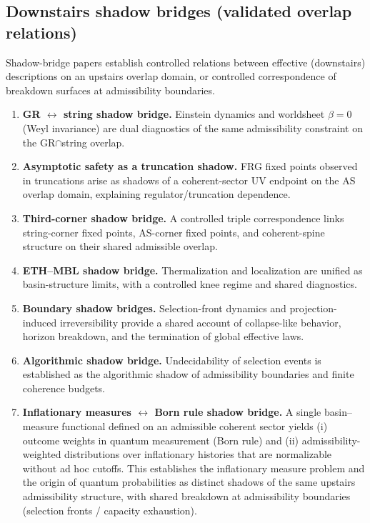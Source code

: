 \documentclass[11pt]{article}
\begin{document}
\subsection{Downstairs shadow bridges (validated overlap relations)}
Shadow-bridge papers establish controlled relations between effective (downstairs) descriptions on an upstairs overlap domain,
or controlled correspondence of breakdown surfaces at admissibility boundaries.

\begin{enumerate}[label=\textbf{B\arabic*}]
\item \textbf{GR $\leftrightarrow$ string shadow bridge.} Einstein dynamics and worldsheet $\beta=0$ (Weyl invariance) are dual diagnostics of the same admissibility constraint on the GR$\cap$string overlap.
\item \textbf{Asymptotic safety as a truncation shadow.} FRG fixed points observed in truncations arise as shadows of a coherent-sector UV endpoint on the AS overlap domain, explaining regulator/truncation dependence.
\item \textbf{Third-corner shadow bridge.} A controlled triple correspondence links string-corner fixed points, AS-corner fixed points, and coherent-spine structure on their shared admissible overlap.
\item \textbf{ETH--MBL shadow bridge.} Thermalization and localization are unified as basin-structure limits, with a controlled knee regime and shared diagnostics.
\item \textbf{Boundary shadow bridges.} Selection-front dynamics and projection-induced irreversibility provide a shared account of collapse-like behavior, horizon breakdown, and the termination of global effective laws.
\item \textbf{Algorithmic shadow bridge.} Undecidability of selection events is established as the algorithmic shadow of admissibility boundaries and finite coherence budgets.
\item \textbf{Inflationary measures $\leftrightarrow$ Born rule shadow bridge.} A single basin–measure functional defined
on an admissible coherent sector yields (i) outcome weights in quantum measurement (Born rule)
and (ii) admissibility-weighted distributions over inflationary histories that are normalizable without
ad hoc cutoffs. This establishes the inflationary measure problem and the origin of quantum
probabilities as distinct shadows of the same upstairs admissibility structure, with shared breakdown
at admissibility boundaries (selection fronts / capacity exhaustion).

\end{enumerate}
\end{document}
